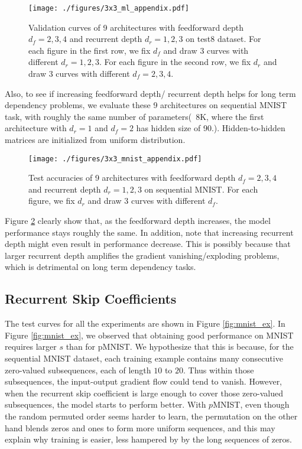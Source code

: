 \begin{figure}[htp]
\center
\texttt{[image: ./figures/3x3\_ml\_appendix.pdf]}
\vspace{-10pt}
\caption{Validation curves of 9 architectures with feedforward depth $d_f = 2, 3, 4$
and recurrent depth $d_r = 1, 2, 3$ on test8 dataset.
For each figure in the first row, we fix $d_f$ and draw $3$ curves with different $d_r=1, 2, 3$.
For each figure in the second row, we fix $d_r$ and draw $3$ curves with different $d_f=2, 3, 4$.
}
\label{fig:3x3lm_ex}
\end{figure}



Also, to see if increasing feedforward depth/ recurrent depth helps
for long term dependency problems, 
we evaluate these 9 architectures on sequential MNIST task, with roughly the
same number of parameters(~8K, where the first architecture with $d_r=1$ and $d_f=2$ has hidden size of 90.). 
Hidden-to-hidden matrices
are initialized from uniform distribution.


\begin{figure}[h]
\center
\texttt{[image: ./figures/3x3\_mnist\_appendix.pdf]}
\vspace{-10pt}
\caption{Test accuracies of 9 architectures with feedforward depth $d_f = 2, 3, 4$
and recurrent depth $d_r = 1, 2, 3$ on sequential MNIST. For each figure,
we fix $d_r$ and draw $3$ curves with different $d_f$.
}
\label{fig:3xxmnist_ex}
\end{figure}



Figure \ref{fig:3xxmnist_ex}
clearly show that, 
as the feedforward depth
increases, the model performance stays roughly the same.
In addition, note that increasing recurrent depth might even result in performance decrease. 
This is possibly because that larger recurrent depth amplifies the gradient
vanishing/exploding problems, which is detrimental on long term
dependency tasks.


\newpage
\subsection{Recurrent Skip Coefficients}

The test curves for all the experiments are shown in Figure \ref{fig:mnist_ex}. 
In Figure \ref{fig:mnist_ex}, we observed that
obtaining good performance on MNIST requires larger $s$ than for pMNIST.
We hypothesize that this is because, for the sequential MNIST dataset, 
each training example contains many consecutive zero-valued subsequences, each of
length $10$ to $20$. Thus within those subsequences, the input-output gradient flow
could tend to vanish. However, when the recurrent skip coefficient is large enough to cover those
zero-valued subsequences, the model starts to perform better.
With $p$MNIST, even though the random permuted order seems harder to learn, the permutation on the other hand
blends zeros and ones to form more uniform sequences, and this may explain why training is easier, less hampered
by by the long sequences of zeros.

